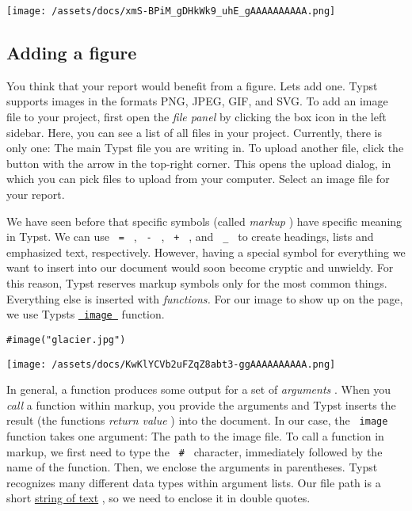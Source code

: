 \texttt{[image: /assets/docs/xmS-BPiM\_gDHkWk9\_uhE\_gAAAAAAAAAA.png]}

\subsection{Adding a figure}\label{figure}

You think that your report would benefit from a figure.
Let\textquotesingle s add one. Typst supports images in the formats PNG,
JPEG, GIF, and SVG. To add an image file to your project, first open the
\emph{file panel} by clicking the box icon in the left sidebar. Here,
you can see a list of all files in your project. Currently, there is
only one: The main Typst file you are writing in. To upload another
file, click the button with the arrow in the top-right corner. This
opens the upload dialog, in which you can pick files to upload from your
computer. Select an image file for your report.


We have seen before that specific symbols (called \emph{markup} ) have
specific meaning in Typst. We can use \texttt{\ =\ } , \texttt{\ -\ } ,
\texttt{\ +\ } , and \texttt{\ \_\ } to create headings, lists and
emphasized text, respectively. However, having a special symbol for
everything we want to insert into our document would soon become cryptic
and unwieldy. For this reason, Typst reserves markup symbols only for
the most common things. Everything else is inserted with
\emph{functions.} For our image to show up on the page, we use
Typst\textquotesingle s
\href{/docs/reference/visualize/image/}{\texttt{\ image\ }} function.

\begin{verbatim}
#image("glacier.jpg")
\end{verbatim}

\texttt{[image: /assets/docs/KwKlYCVb2uFZqZ8abt3-ggAAAAAAAAAA.png]}

In general, a function produces some output for a set of
\emph{arguments} . When you \emph{call} a function within markup, you
provide the arguments and Typst inserts the result (the
function\textquotesingle s \emph{return value} ) into the document. In
our case, the \texttt{\ image\ } function takes one argument: The path
to the image file. To call a function in markup, we first need to type
the \texttt{\ \#\ } character, immediately followed by the name of the
function. Then, we enclose the arguments in parentheses. Typst
recognizes many different data types within argument lists. Our file
path is a short \href{/docs/reference/foundations/str/}{string of text}
, so we need to enclose it in double quotes.

